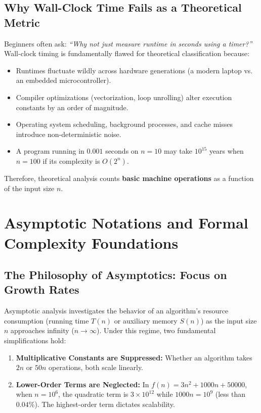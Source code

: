 \documentclass[11pt,a4paper]{article}
\begin{document}
\subsection{Why Wall-Clock Time Fails as a Theoretical Metric}
Beginners often ask: \emph{``Why not just measure runtime in seconds using a timer?''} Wall-clock timing is fundamentally flawed for theoretical classification because:
\begin{itemize}[itemsep=1pt]
    \item Runtimes fluctuate wildly across hardware generations (a modern laptop vs. an embedded microcontroller).
    \item Compiler optimizations (vectorization, loop unrolling) alter execution constants by an order of magnitude.
    \item Operating system scheduling, background processes, and cache misses introduce non-deterministic noise.
    \item A program running in $0.001$ seconds on $n = 10$ may take $10^{15}$ years when $n = 100$ if its complexity is $O(2^n)$.
\end{itemize}
Therefore, theoretical analysis counts \textbf{basic machine operations} as a function of the input size $n$.

\newpage
\section{Asymptotic Notations and Formal Complexity Foundations}

\subsection{The Philosophy of Asymptotics: Focus on Growth Rates}
Asymptotic analysis investigates the behavior of an algorithm's resource consumption (running time $T(n)$ or auxiliary memory $S(n)$) as the input size $n$ approaches infinity ($n \to \infty$). Under this regime, two fundamental simplifications hold:
\begin{enumerate}[itemsep=1pt]
    \item \textbf{Multiplicative Constants are Suppressed:} Whether an algorithm takes $2n$ or $50n$ operations, both scale linearly.
    \item \textbf{Lower-Order Terms are Neglected:} In $f(n) = 3n^2 + 1000n + 50000$, when $n = 10^6$, the quadratic term is $3 \times 10^{12}$ while $1000n = 10^9$ (less than $0.04\%$). The highest-order term dictates scalability.
\end{enumerate}
\end{document}
